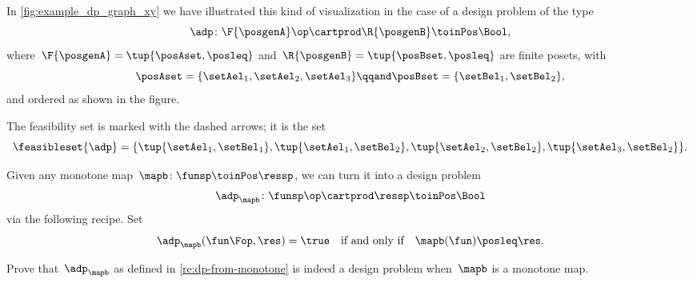 \begin{marginfigure}
	\centering
	\caption{}
	\label{fig:example_dp_graph_xy}
\end{marginfigure}

\begin{example}
	\label{exa:visualize-dp}
	In \cref{fig:example_dp_graph_xy} we have illustrated this kind of visualization in the case of a design problem of the type
	\begin{equation*}
		\adp \colon \F{\posgenA} \op \cartprod  \R{\posgenB} \toinPos \Bool,
	\end{equation*}
	where~$\F{\posgenA} = \tup{\posAset, \posleq}$ and~$ \R{\posgenB} = \tup{\posBset, \posleq}$ are finite posets, with
	\begin{equation}
		\posAset = \{ \setAel_1, \setAel_2, \setAel_3 \}
		\qqand
		\posBset =  \{ \setBel_1, \setBel_2\},
	\end{equation}
	and ordered as shown in the figure.

	The feasibility set is marked with the dashed arrows; it is the set
	\begin{equation*}
		\feasibleset{\adp} = \{\tup{\setAel_1, \setBel_1}, \tup{\setAel_1, \setBel_2}, \tup{\setAel_2, \setBel_2}, \tup{\setAel_3, \setBel_2} \}.
	\end{equation*}
\end{example}

\begin{remark}
	\label{re:dp-from-monotone}
	Given any monotone map~$\mapb\colon \funsp \toinPos \ressp$, we can turn it into a design problem
	\begin{equation*}
		\adp_\mapb \colon \funsp\op \cartprod \ressp \toinPos \Bool
	\end{equation*}
	via the following recipe.
	Set
	\begin{equation*}
		\adp_\mapb (\fun\Fop, \res) = \true \quad \text{if and only if} \quad \mapb(\fun) \posleq \res.
	\end{equation*}
\end{remark}

\begin{exercise}
	\label{ex:adp-monotone}
	Prove that~$\adp_\mapb$ as defined in \cref{re:dp-from-monotone} is indeed a design problem when~$\mapb$ is a monotone map.
\end{exercise}
%
\begin{solution}
	\missingsolution
\end{solution}

